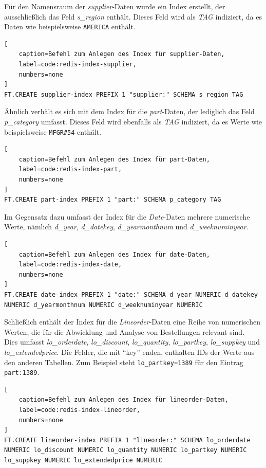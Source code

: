 Für den Namensraum der \emph{supplier}-Daten wurde ein Index erstellt, der ausschließlich das Feld \emph{s\_region} enthält. Dieses Feld wird als \emph{TAG} indiziert, da es Daten wie beispielsweise \lstinline|AMERICA| enthält. %

\begin{lstlisting}[
    caption=Befehl zum Anlegen des Index für supplier-Daten,
    label=code:redis-index-supplier,
    numbers=none
]
FT.CREATE supplier-index PREFIX 1 "supplier:" SCHEMA s_region TAG
\end{lstlisting}


Ähnlich verhält es sich mit dem Index für die \emph{part}-Daten, der lediglich das Feld \emph{p\_category} umfasst. Dieses Feld wird ebenfalls als \emph{TAG} indiziert, da es Werte wie beispielsweise \lstinline|MFGR#54| enthält.

\begin{lstlisting}[
    caption=Befehl zum Anlegen des Index für part-Daten,
    label=code:redis-index-part,
    numbers=none
]
FT.CREATE part-index PREFIX 1 "part:" SCHEMA p_category TAG
\end{lstlisting}


Im Gegensatz dazu umfasst der Index für die \emph{Date}-Daten mehrere numerische Werte, nämlich \emph{d\_year}, \emph{d\_datekey}, \emph{d\_yearmonthnum} und \emph{d\_weeknuminyear}. 

\begin{lstlisting}[
    caption=Befehl zum Anlegen des Index für date-Daten,
    label=code:redis-index-date,
    numbers=none
]
FT.CREATE date-index PREFIX 1 "date:" SCHEMA d_year NUMERIC d_datekey NUMERIC d_yearmonthnum NUMERIC d_weeknuminyear NUMERIC
\end{lstlisting}


Schließlich enthält der Index für die \emph{Lineorder}-Daten eine Reihe von numerischen Werten, die für die Abwicklung und Analyse von Bestellungen relevant sind.\\
Dies umfasst \emph{lo\_orderdate}, \emph{lo\_discount}, \emph{lo\_quantity}, \emph{lo\_partkey}, \emph{lo\_suppkey} und \emph{lo\_extendedprice}. Die Felder, die mit \enquote{key} enden, enthalten IDs der Werte aus den anderen Tabellen. Zum Beispiel steht \lstinline|lo_partkey=1389| für den Eintrag \lstinline|part:1389|.

\begin{lstlisting}[
    caption=Befehl zum Anlegen des Index für lineorder-Daten,
    label=code:redis-index-lineorder,
    numbers=none
]
FT.CREATE lineorder-index PREFIX 1 "lineorder:" SCHEMA lo_orderdate NUMERIC lo_discount NUMERIC lo_quantity NUMERIC lo_partkey NUMERIC lo_suppkey NUMERIC lo_extendedprice NUMERIC
\end{lstlisting}


